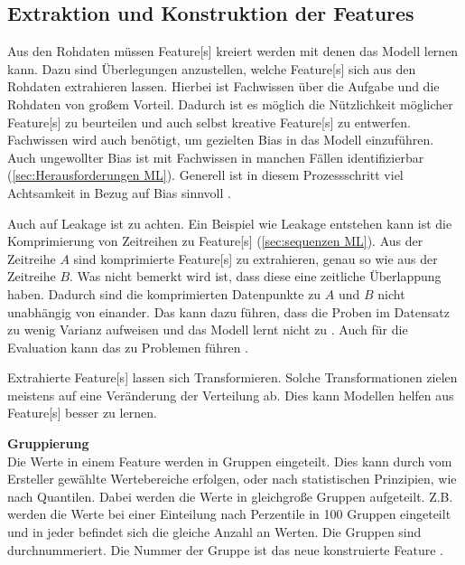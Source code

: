 \subsection{Extraktion und Konstruktion der Features} \label{sec:ML FeatExtr}
Aus den Rohdaten müssen \gls{Feature}[s] kreiert werden mit denen das Modell lernen kann. Dazu sind Überlegungen anzustellen, welche \gls{Feature}[s] sich aus den Rohdaten extrahieren lassen. Hierbei ist Fachwissen über die Aufgabe und die Rohdaten von großem Vorteil. Dadurch ist es möglich die Nützlichkeit möglicher \gls{Feature}[s] zu beurteilen und auch selbst kreative \gls{Feature}[s] zu entwerfen. Fachwissen wird auch benötigt, um gezielten \gls{Bias} in das Modell einzuführen. Auch ungewollter \gls{Bias} ist mit Fachwissen in manchen Fällen identifizierbar (\ref{sec:Herausforderungen ML}). Generell ist in diesem Prozessschritt viel Achtsamkeit in Bezug auf \gls{Bias} sinnvoll \cite{Zheng.2018, Geron.2019}. \par

Auch auf \gls{Leakage} ist zu achten. Ein Beispiel wie \gls{Leakage} entstehen kann ist die Komprimierung von Zeitreihen zu \gls{Feature}[s] (\ref{sec:sequenzen ML}). Aus der Zeitreihe \(A\) sind komprimierte  \gls{Feature}[s] zu extrahieren, genau so wie aus der Zeitreihe \(B\). Was nicht bemerkt wird ist, dass diese eine zeitliche Überlappung haben. Dadurch sind die komprimierten Datenpunkte zu \(A\) und \(B\) nicht unabhängig von einander. Das kann dazu führen, dass die Proben im Datensatz zu wenig Varianz aufweisen und das Modell lernt nicht zu . Auch für die Evaluation kann das zu Problemen führen \cite{Zheng.2018, Geron.2019}. \par

Extrahierte \gls{Feature}[s] lassen sich Transformieren. Solche Transformationen zielen meistens auf eine Veränderung der Verteilung ab. Dies kann Modellen helfen aus \gls{Feature}[s] besser zu lernen. \dubpar

\textbf{Gruppierung}\\
Die Werte in einem \gls{Feature} werden in Gruppen eingeteilt. Dies kann durch vom Ersteller gewählte Wertebereiche erfolgen, oder nach statistischen Prinzipien, wie nach Quantilen. Dabei werden die Werte in gleichgroße Gruppen aufgeteilt. Z.B. werden die Werte bei einer Einteilung nach Perzentile in 100 Gruppen eingeteilt und in jeder befindet sich die gleiche Anzahl an Werten. Die Gruppen sind durchnummeriert. Die Nummer der Gruppe ist das neue konstruierte \gls{Feature} \cite{Zheng.2018}. \dubpar

